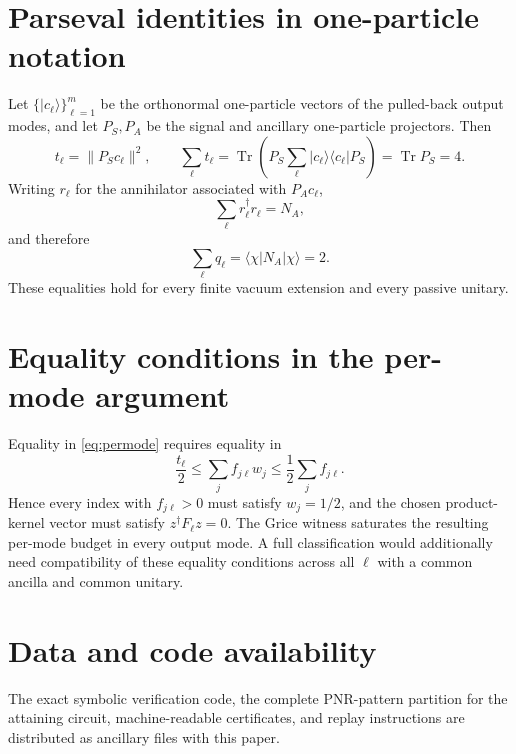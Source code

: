 \documentclass[11pt]{article}
\theoremstyle{remark}
\newcommand{\ket}[1]{\lvert #1\rangle}
\newcommand{\bra}[1]{\langle #1\rvert}
\newcommand{\norm}[1]{\lVert #1\rVert}
\newcommand{\Tr}{\operatorname{Tr}}
\begin{document}
\appendix

\section{Parseval identities in one-particle notation}
\label{app:parseval}

Let \(\{\ket{c_\ell}\}_{\ell=1}^m\) be the orthonormal one-particle vectors of
the pulled-back output modes, and let \(P_S,P_A\) be the signal and ancillary
one-particle projectors. Then
\begin{equation}
  t_\ell=\norm{P_Sc_\ell}^2,
  \qquad
  \sum_\ell t_\ell
   =\Tr\!\left(P_S\sum_\ell\ket{c_\ell}\bra{c_\ell}P_S\right)
   =\Tr P_S=4.
\end{equation}
Writing \(r_\ell\) for the annihilator associated with \(P_Ac_\ell\),
\begin{equation}
  \sum_\ell r_\ell^\dagger r_\ell=N_A,
\end{equation}
and therefore
\begin{equation}
  \sum_\ell q_\ell
   =\bra\chi N_A\ket\chi=2.
\end{equation}
These equalities hold for every finite vacuum extension and every passive
unitary.

\section{Equality conditions in the per-mode argument}
\label{app:equality}

Equality in \cref{eq:permode} requires equality in
\begin{equation}
  \frac{t_\ell}{2}
   \le\sum_jf_{j\ell}w_j
   \le\frac12\sum_jf_{j\ell}.
\end{equation}
Hence every index with \(f_{j\ell}>0\) must satisfy \(w_j=1/2\), and the chosen
product-kernel vector must satisfy \(z^\dagger F_\ell z=0\). The Grice witness
saturates the resulting per-mode budget in every output mode. A full
classification would additionally need compatibility of these equality
conditions across all \(\ell\) with a common ancilla and common unitary.

\section*{Data and code availability}

The exact symbolic verification code, the complete PNR-pattern partition for
the attaining circuit, machine-readable certificates, and replay
instructions are distributed as ancillary files with this paper.
\end{document}
